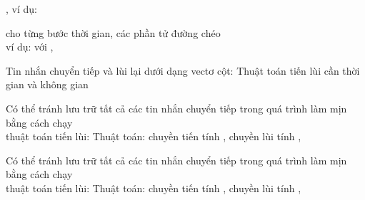 \documentclass{article}
\begin{document}
\begin{huge}
 , ví dụ: 

  cho từng bước thời gian, các phần tử đường chéo \\
ví dụ: với , 

Tin nhắn chuyển tiếp và lùi lại dưới dạng vectơ cột:
Thuật toán tiến lùi cần thời gian  và không gian 


Có thể tránh lưu trữ tất cả các tin nhắn chuyển tiếp trong quá trình làm mịn bằng cách chạy \\
thuật toán tiến lùi:
Thuật toán: chuyền tiến tính , chuyền lùi tính , 

\vspace{0.2in}

\textwidth
{}


Có thể tránh lưu trữ tất cả các tin nhắn chuyển tiếp trong quá trình làm mịn bằng cách chạy \\
thuật toán tiến lùi:
Thuật toán: chuyền tiến tính , chuyền lùi tính , 


\end{huge}
\end{document}
